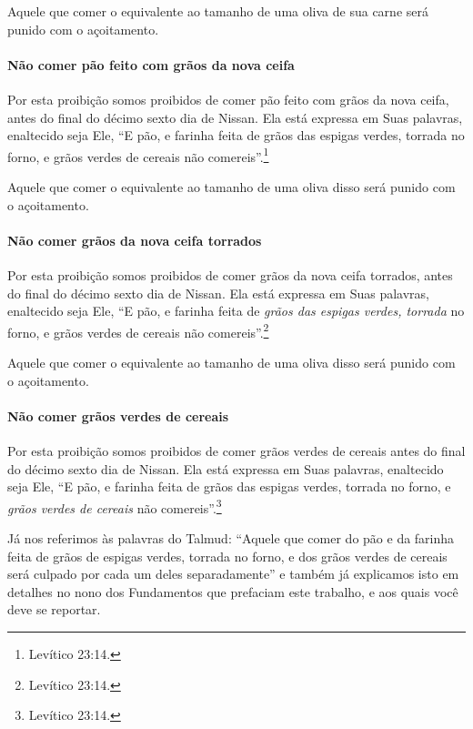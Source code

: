\begin{multicols}{2}
Aquele que comer o equivalente ao tamanho de uma oliva de sua carne será
punido com o açoitamento.


\paragraph{Não comer pão feito com grãos da nova ceifa}

Por esta proibição somos proibidos de comer pão feito com grãos da nova
ceifa, antes do final do décimo sexto dia de Nissan\starr. Ela está expressa
em Suas palavras, enaltecido seja Ele, ``E pão, e farinha feita de grãos
das espigas verdes, torrada no forno, e grãos verdes de cereais não
comereis''.\footnote{Levítico 23:14.}

Aquele que comer o equivalente ao tamanho de uma oliva disso será punido
com o açoitamento.

\paragraph{Não comer grãos da nova ceifa torrados}

Por esta proibição somos proibidos de comer grãos da nova ceifa
torrados, antes do final do décimo sexto dia de Nissan\starr. Ela está
expressa em Suas palavras, enaltecido seja Ele, ``E pão, e farinha feita
de \emph{grãos das espigas verdes, torrada} no forno, e grãos verdes de
cereais não comereis''.\footnote{Levítico 23:14.}

Aquele que comer o equivalente ao tamanho de uma oliva disso será punido
com o açoitamento.

\paragraph{Não comer grãos verdes de cereais}

Por esta proibição somos proibidos de comer grãos verdes de cereais
antes do final do décimo sexto dia de Nissan\starr. Ela está expressa em Suas
palavras, enaltecido seja Ele, ``E pão, e farinha feita de grãos das
espigas verdes, torrada no forno, e \emph{grãos verdes de cereais} não
comereis''.\footnote{Levítico 23:14.}

Já nos referimos às palavras do Talmud\starr: ``Aquele que comer do pão e da
farinha feita de grãos de espigas verdes, torrada no forno, e dos grãos
verdes de cereais será culpado por cada um deles separadamente'' e
também já explicamos isto em detalhes no nono dos Fundamentos que
prefaciam este trabalho, e aos quais você deve se reportar.


\end{multicols}
